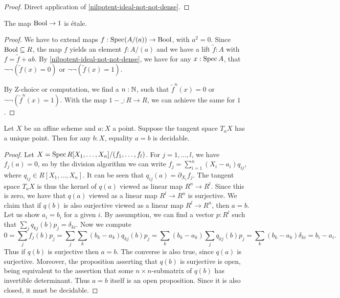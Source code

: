 \begin{proof}
  Direct application of \cref{nilpotent-ideal-not-not-dense}.
\end{proof}

\begin{proposition}%
  The map $\mathrm{Bool}\to 1$ is étale.
\end{proposition}

\begin{proof}
  We have to extend maps $f:\operatorname{Spec} (A/(a))\to \mathrm{Bool}$, with $a^2=0$.
  Since $\mathrm{Bool}\subseteq R$, the map $f$ yields an element $f:A/(a)$
  and we have a lift $\tilde{f}:A$ with $f=\tilde{f}+ab$.
  By \cref{nilpotent-ideal-not-not-dense},
  we have for any $x:\operatorname{Spec} A$, that $\neg\neg(\tilde{f}(x)=0)$ or $\neg\neg(\tilde{f}(x)=1)$.

  By Z-choice or computation, we find a $n:\mathbb{N}$,
  such that $\tilde{f}^n(x)=0$ or $\neg\neg(\tilde{f}^n(x)=1)$.
  With the map $1-\_:R\to R$, we can achieve the same for $1$.
\end{proof}

\begin{proposition}%
	\label{decidable-of-tangent}
	Let $X$ be an affine scheme and $a : X$ a point. Suppose the tangent space
	$T_a X$ has a unique point. Then for any $b : X$, equality $a = b$ is decidable.
\end{proposition}

\begin{proof}
	Let $X = \operatorname{Spec} R[X_1,\ldots,X_n]/(f_1,\ldots,f_l)$.
	For $j = 1,\ldots,l$, we have $f_j(a) = 0$, so by the division algorithm
	we can write $f_j = \sum_{i = 1}^n (X_i-a_i)q_{ij}$, where
	$q_{ij} \in R[X_1,\ldots,X_n]$.
	It can be seen that $q_{ij}(a) = \partial_{X_i}f_j$.
	The tangent space $T_a X$ is thus the kernel of $q(a)$ viewed as 
	linear map $R^n \to R^l$.
	Since this is zero, we have that $q(a)$ viewed as a linear map
	$R^l \to R^n$ is surjective.
	We claim that if $q(b)$ is also surjective viewed as a linear map
	$R^l \to R^n$, then $a = b$.
	Let us show $a_i = b_i$ for a given $i$.
	By assumption, we can find a vector $p : R^l$ such
	that $\sum_j q_{kj}(b)p_j = \delta_{ki}$.
	Now we compute
	\[
	0 = \sum_j f_j(b)p_j 
	= \sum_j \sum_k (b_k-a_k)q_{kj}(b)p_j 
	= \sum_k (b_k-a_k) \sum_j q_{kj}(b)p_j 
	= \sum_k (b_k-a_k) \delta_{ki} 
	= b_i - a_i.
	\]
	Thus if $q(b)$ is surjective then $a = b$. The converse is also true,
	since $q(a)$ is surjective.
	Moreover, the proposition asserting that $q(b)$ is surjective
	is open, being equivalent to the assertion that some 
	$n \times n$-submatrix of $q(b)$ has invertible determinant.
	Thus $a = b$ itself is an open proposition. 
	Since it is also closed, it must be decidable.
\end{proof}

